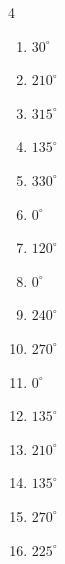 \begin{multicols}{4}
\begin{enumerate}
  \item $\displaystyle 30^{\circ}$

  \item $\displaystyle 210^{\circ}$

  \item $\displaystyle 315^{\circ}$

  \item $\displaystyle 135^{\circ}$

  \item $\displaystyle 330^{\circ}$

  \item $\displaystyle 0^{\circ}$
        \phantom{$\displaystyle =0$}

  \item $\displaystyle 120^{\circ}$

  \item $\displaystyle 0^{\circ}$
        \phantom{$\displaystyle =0$}

  \item $\displaystyle 240^{\circ}$

  \item $\displaystyle 270^{\circ}$

  \item $\displaystyle 0^{\circ}$
        \phantom{$\displaystyle =0$}

  \item $\displaystyle 135^{\circ}$

  \item $\displaystyle 210^{\circ}$

  \item $\displaystyle 135^{\circ}$

  \item $\displaystyle 270^{\circ}$

  \item $\displaystyle 225^{\circ}$


\end{enumerate}
\end{multicols}
